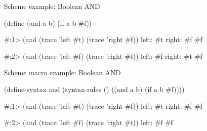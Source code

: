 \begin{frame}[fragile]{Scheme example: Boolean AND}
\begin{listingbox}\begin{schemecode}
(define (and a b)
  (if a b #f))
\end{schemecode}\end{listingbox}
\begin{listingbox}\begin{schemerepl}
#;1> (and (trace 'left #t) (trace 'right #f))
left: #t
right: #f
#f

#;2> (and (trace 'left #f) (trace 'right #t))
left: #f
right: #t
#f
\end{schemerepl}\end{listingbox}
\end{frame}
\begin{frame}[fragile]{Scheme macro example: Boolean AND}
\begin{listingbox}\begin{schemecode}
(define-syntax and
  (syntax-rules ()
    ((and a b)
     (if a b #f))))
\end{schemecode}\end{listingbox}
\begin{listingbox}\begin{schemerepl}
#;1> (and (trace 'left #t) (trace 'right #f))
left: #t
right: #f
#f

#;2> (and (trace 'left #f) (trace 'right #t))
left: #f
#f
\end{schemerepl}\end{listingbox}
\end{frame}

